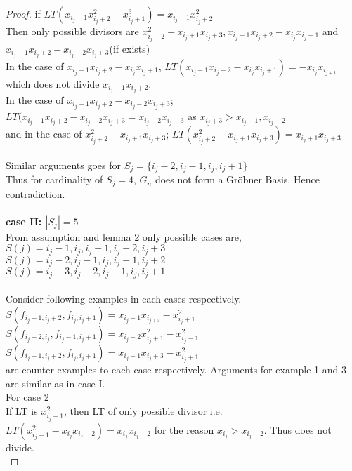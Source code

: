 \documentclass[12pt,a4paper]{article}
\theoremstyle{definition}
\begin{document}
\begin{proof}
\noindent if $LT(x_{i_{j}-1}x_{i_{j}+2}^{2}-x_{i_{j}+1}^{3})=x_{i_{j}-1}x_{i_{j}+2}^2$    
\\
Then only possible divisors are  $x_{i_{j}+2}^2-x_{i_{j}+1}x_{i_{j}+3}, x_{i_{j}-1}x_{i_{j}+2}-x_{i_{j}}x_{i_{j}+1}$ and $x_{i_{j}-1}x_{i_{j}+2}-x_{i_{j}-2}x_{i_{j}+3}$(if exists)\\
In the case of $x_{i_{j}-1}x_{i_{j}+2}-x_{i_{j}}x_{i_{j}+1}$, $LT(x_{i_{j}-1}x_{i_{j}+2}-x_{i_{j}}x_{i_{j}+1}) = -x_{i_{j}}x_{i_{j+1}}$ which does not divide $x_{i_{j}-1}x_{i_{j}+2}$.\\
In the case of $x_{i_{j}-1}x_{i_{j}+2}-x_{i_{j}-2}x_{i_{j}+3}$; \\
$LT(x_{i_{j}-1}x_{i_{j}+2}-x_{i_{j}-2}x_{i_{j}+3}=x_{i_{j}-2}x_{i_{j}+3}$ as $x_{i_{j}+3}>x_{i_{j}-1}, x_{i_{j}+2}$\\
and in the case of $x_{i_{j}+2}^2-x_{i_{j}+1}x_{i_{j}+3}$; $LT(x_{i_{j}+2}^2-x_{i_{j}+1}x_{i_{j}+3})=x_{i_{j}+1}x_{i_{j}+3}$
\\
\\
Similar arguments goes for $S_{j}=\{i_{j}-2, i_{j}-1, i_{j}, i_{j}+1\}$
\\ Thus for cardinality of $S_{j}=4$,  $G_{n}$ does not form a Gr\"{o}bner Basis.
Hence contradiction.
\\
\\
{\noindent \bf case II: $|S_j|=5$}
\\
From assumption and lemma 2 only possible cases are, \\
$S(j)={i_j-1,i_j,i_j+1,i_j+2,i_j+3}$\\
$S(j)={i_j-2,i_j-1,i_j,i_j+1,i_j+2}$\\
$S(j)={i_j-3,i_j-2,i_j-1,i_j,i_j+1}$\\
\\
Consider following examples in each cases respectively. \\
$S(f_{i_{j}-1,i_{j}+2},f_{i_{j},i_{j}+1})=x_{i_{j}-1}x_{i_{j+3}}-x_{i_{j}+1}^{2}$\\
$S(f_{i_{j}-2,i_{j}},f_{i_{j}-1,i_{j}+1})=x_{i_{j}-2}x_{i_{j}+1}^{2}-x_{i_{j}-1}^{2}$\\
$S(f_{i_{j}-1,i_{j}+2},f_{i_{j},i_{j}+1})=x_{i_{j}-1}x_{i_{j}+3}-x_{i_{j}+1}^2$\\
are counter examples to each case respectively. Arguments for example 1 and 3 are similar as in case I.\\
For case 2\\
If LT is $x_{i_{j}-1}^{2}$, then LT of only possible divisor i.e. $LT(x_{i_{j}-1}^{2}-x_{i_{j}}x_{i_{j}-2})=x_{i_{j}}x_{i_{j}-2}$ for the reason $x_{i_{j}}>x_{i_{j}-2}$. Thus does not divide.\\

\end{proof}
\end{document}
